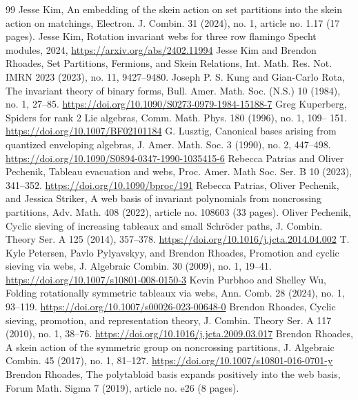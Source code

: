 \documentclass[10pt]{amsart}
\theoremstyle{definition}
\theoremstyle{plain}
\theoremstyle{plain}
\theoremstyle{definition}
\theoremstyle{remark}
\theoremstyle{plain}
\theoremstyle{plain}
\theoremstyle{plain}
\numberwithin{equation}{section}
\begin{document}
\begin{thebibliography}{99}
 Jesse Kim, An embedding of the skein action on set partitions into the skein action on matchings, Electron. J. Combin. 31 (2024), no. 1, article no. 1.17 (17 pages). 
 Jesse Kim, Rotation invariant webs for three row flamingo Specht modules, 2024, \url{https://arxiv.org/abs/2402.11994}
 Jesse Kim and Brendon Rhoades, Set Partitions, Fermions, and Skein Relations, Int. Math. Res. Not. IMRN 2023 (2023), no. 11, 9427–9480. 
 Joseph P. S. Kung and Gian-Carlo Rota, The invariant theory of binary forms, Bull. Amer. Math. Soc. (N.S.) 10 (1984), no. 1, 27–85. \url{https://doi.org/10.1090/S0273-0979-1984-15188-7}
 Greg Kuperberg, Spiders for rank 2 Lie algebras, Comm. Math. Phys. 180 (1996), no. 1, 109– 151. \url{https://doi.org/10.1007/BF02101184}
 G. Lusztig, Canonical bases arising from quantized enveloping algebras, J. Amer. Math. Soc. 3 (1990), no. 2, 447–498. \url{https://doi.org/10.1090/S0894-0347-1990-1035415-6}
 Rebecca Patrias and Oliver Pechenik, Tableau evacuation and webs, Proc. Amer. Math Soc. Ser. B 10 (2023), 341–352. \url{https://doi.org/10.1090/bproc/191}
 Rebecca Patrias, Oliver Pechenik, and Jessica Striker, A web basis of invariant polynomials from noncrossing partitions, Adv. Math. 408 (2022), article no. 108603 (33 pages). 
 Oliver Pechenik, Cyclic sieving of increasing tableaux and small Schröder paths, J. Combin. Theory Ser. A 125 (2014), 357–378. \url{https://doi.org/10.1016/j.jcta.2014.04.002}
 T. Kyle Petersen, Pavlo Pylyavskyy, and Brendon Rhoades, Promotion and cyclic sieving via webs, J. Algebraic Combin. 30 (2009), no. 1, 19–41. \url{https://doi.org/10.1007/s10801-008-0150-3}
 Kevin Purbhoo and Shelley Wu, Folding rotationally symmetric tableaux via webs, Ann. Comb. 28 (2024), no. 1, 93–119. \url{https://doi.org/10.1007/s00026-023-00648-0}
 Brendon Rhoades, Cyclic sieving, promotion, and representation theory, J. Combin. Theory Ser. A 117 (2010), no. 1, 38–76. \url{https://doi.org/10.1016/j.jcta.2009.03.017}
 Brendon Rhoades, A skein action of the symmetric group on noncrossing partitions, J. Algebraic Combin. 45 (2017), no. 1, 81–127. \url{https://doi.org/10.1007/s10801-016-0701-y}
 Brendon Rhoades, The polytabloid basis expands positively into the web basis, Forum Math. Sigma 7 (2019), article no. e26 (8 pages). 

\end{thebibliography}
\end{document}
